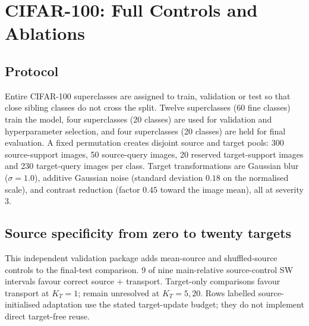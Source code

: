 \section{CIFAR-100: Full Controls and Ablations}
\label{app:cifar}

\subsection{Protocol}
Entire CIFAR-100 superclasses are assigned to train, validation or test so that close sibling classes do not cross the split. Twelve superclasses (60 fine classes) train the model, four superclasses (20 classes) are used for validation and hyperparameter selection, and four superclasses (20 classes) are held for final evaluation. A fixed permutation creates disjoint source and target pools: 300 source-support images, 50 source-query images, 20 reserved target-support images and 230 target-query images per class. Target transformations are Gaussian blur ($\sigma=1.0$), additive Gaussian noise (standard deviation $0.18$ on the normalised scale), and contrast reduction (factor $0.45$ toward the image mean), all at severity 3.

\subsection{Source specificity from zero to twenty targets}
This independent validation package adds mean-source and shuffled-source controls to the final-test comparison. 9 of nine main-relative source-control SW intervals favour correct source $+$ transport. Target-only comparisons favour transport at $K_T=1$; remain unresolved at $K_T=5,20$. Rows labelled source-initialised adaptation use the stated target-update budget; they do not implement direct target-free reuse.

